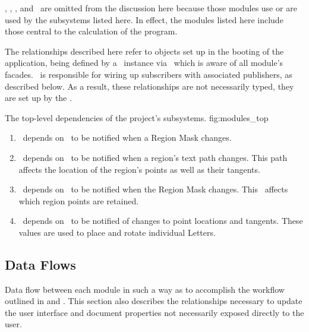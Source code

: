 \docmod, \uimod, \permod, and \bmmod\ are omitted from the discussion here because those modules use or are used by the subsystems listed here.
In effect, the modules listed here include those central to the calculation of the program.

The relationships described here refer to objects set up in the booting of the application, being defined by a \sysfact\ instance via \sysbldr\ which is aware of all module's facades.
\sysbldr\ is responsible for wiring up subscribers with associated publishers, as described below.
As a result, these relationships are not necessarily typed, they are set up by the \sysfact.

{The top-level dependencies of the project's subsystems.}
{fig:modules_top}
{\diagsize}

\begin{enumerate}
  \item \linemod\ depends on \regmod\ to be notified when a Region Mask changes.
  \item \ptmod\ depends on \linemod\ to be notified when a region's text path changes.  This path affects the location of the region's points as well as their tangents.
  \item \ptmod\ depends on \regmod\ to be notified when the Region Mask changes.  This \bmtype\ affects which region points are retained.
  \item {}\ depends on \ptmod\ to be notified of changes to point locations and tangents.  These values are used to place and rotate individual Letters.
\end{enumerate}




\subsection{Data Flows}
\label{sec:dataflows}
Data flow between each module in such a way as to accomplish the workflow outlined in  and .
This section also describes the relationships necessary to update the user interface and document properties not necessarily exposed directly to the user.

